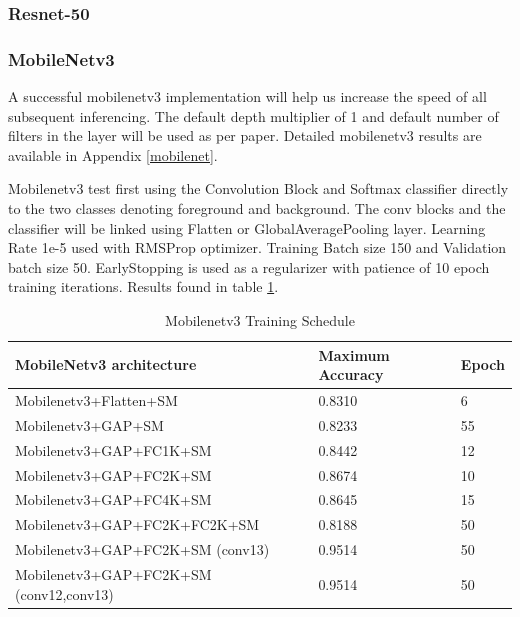 \documentclass{IEEEtran}
\begin{document}
\subsubsection{Resnet-50}



\subsubsection{MobileNetv3}

A successful mobilenetv3 implementation will help us increase the speed of all subsequent inferencing. The default depth multiplier of 1 and default number of filters in the layer will be used as per paper. Detailed mobilenetv3 results are available in Appendix \ref{mobilenet}.

Mobilenetv3 test first using the Convolution Block and Softmax classifier directly to the two classes denoting foreground and background. The conv blocks and the classifier will be linked using Flatten or GlobalAveragePooling layer. Learning Rate 1e-5 used with RMSProp optimizer. Training Batch size 150 and Validation batch size 50. EarlyStopping is used as a regularizer with patience of 10 epoch training iterations. Results found in table \ref{mobilenetschedule}.

\begin{table}[ht]
\centering
\caption{Mobilenetv3 Training Schedule}
\label{mobilenetschedule}
\begin{tabular}{|l|l|l|} 
\hline
\textbf{MobileNetv3 architecture}                & \textbf{Maximum Accuracy }& \textbf{Epoch  }\\ 
\hline
Mobilenetv3+Flatten+SM                  & 0.8310           & 6      \\
Mobilenetv3+GAP+SM                      & 0.8233           & 55     \\
Mobilenetv3+GAP+FC1K+SM                 & 0.8442           & 12     \\
Mobilenetv3+GAP+FC2K+SM                 & 0.8674           & 10     \\
Mobilenetv3+GAP+FC4K+SM                 & 0.8645           & 15     \\
Mobilenetv3+GAP+FC2K+FC2K+SM            & 0.8188           & 50     \\
Mobilenetv3+GAP+FC2K+SM (conv13)        & 0.9514           & 50     \\
Mobilenetv3+GAP+FC2K+SM (conv12,conv13) & 0.9514           & 50     \\
\hline
\end{tabular}
\end{table}
\end{document}
